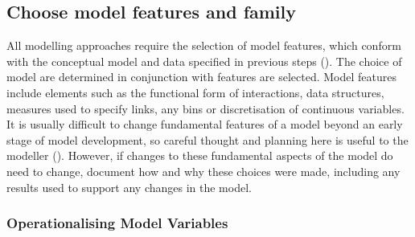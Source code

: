 \documentclass[
]{article}
\begin{document}
\subsection{Choose model features and
family}\label{choose-model-features-and-family}

\begin{tcolorbox}[enhanced jigsaw, opacitybacktitle=0.6, bottomrule=.15mm, leftrule=.75mm, rightrule=.15mm, colbacktitle=quarto-callout-note-color!10!white, toprule=.15mm, titlerule=0mm, left=2mm, colframe=quarto-callout-note-color-frame, breakable, title=\textcolor{quarto-callout-note-color}{\faInfo}\hspace{0.5em}{Explanation}, opacityback=0, coltitle=black, bottomtitle=1mm, colback=white, toptitle=1mm, arc=.35mm]

All modelling approaches require the selection of model features, which
conform with the conceptual model and data specified in previous steps
(). The choice of
model are determined in conjunction with features are selected. Model
features include elements such as the functional form of interactions,
data structures, measures used to specify links, any bins or
discretisation of continuous variables. It is usually difficult to
change fundamental features of a model beyond an early stage of model
development, so careful thought and planning here is useful to the
modeller (). However,
if changes to these fundamental aspects of the model do need to change,
document how and why these choices were made, including any results used
to support any changes in the model.

\end{tcolorbox}

\subsubsection{Operationalising Model
Variables}\label{operationalising-model-variables}
\end{document}
